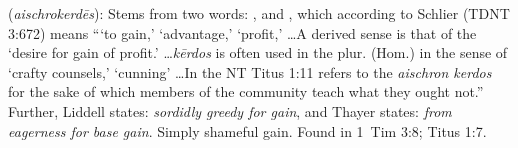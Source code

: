 \item[Shameful gain,]

(\textit{aischrokerdēs}):
Stems from two words:  , and , which according to Schlier (TDNT 3:672) means ```to gain,' `advantage,' `profit,' \ldots A derived sense is that of the `desire for gain of profit.' \ldots \emph{kērdos} is often used in the plur. (Hom.) in the sense of `crafty counsels,' `cunning' \ldots In the NT Titus 1:11 refers to the \emph{aischron kerdos} for the sake of which members of the community teach what they ought not.'' 
Further, Liddell states: \emph{sordidly greedy for gain}, and Thayer states: \emph{from eagerness for base gain}. Simply shameful gain.
Found in 1~Tim 3:8; Titus 1:7.

